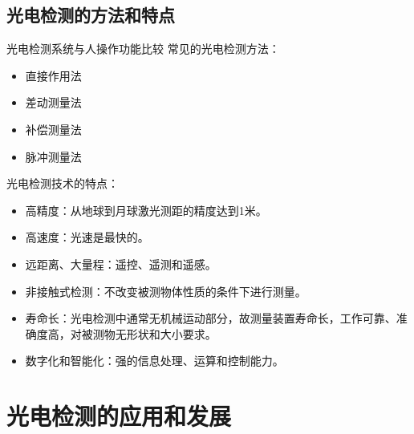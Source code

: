 \documentclass[10pt]{beamer}
\begin{document}
\subsection{光电检测的方法和特点}
\begin{frame}{光电检测系统与人操作功能比较}
\alert{常见的光电检测方法：}
    \begin{itemize}
        \item 直接作用法
        \item 差动测量法
        \item 补偿测量法
        \item 脉冲测量法
 
    \end{itemize}
    \alert{光电检测技术的特点：}
    \begin{itemize}
        \item<2-| alert@2> 高精度：从地球到月球激光测距的精度达到1米。
        \item<2-| alert@3> 高速度：光速是最快的。
        \item <2-| alert@4>远距离、大量程：遥控、遥测和遥感。
        \item <2-| alert@5>非接触式检测：不改变被测物体性质的条件下进行测量。
        \item<2-| alert@6> 寿命长：光电检测中通常无机械运动部分，故测量装置寿命长，工作可靠、准确度高，对被测物无形状和大小要求。
        \item<2-| alert@7> 数字化和智能化：强的信息处理、运算和控制能力。
 
    \end{itemize}
\end{frame}


\section{光电检测的应用和发展}
\end{document}
